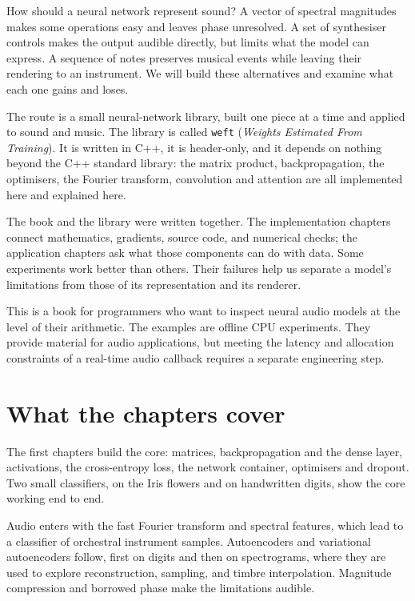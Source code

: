 
How should a neural network represent sound? A vector of spectral
magnitudes makes some operations easy and leaves phase unresolved. A
set of synthesiser controls makes the output audible directly, but limits
what the model can express. A sequence of notes preserves musical
events while leaving their rendering to an instrument. We will build
these alternatives and examine what each one gains and loses.

The route is a small neural-network library, built one piece at a
time and applied to sound and music. The
library is called \texttt{weft} (\emph{Weights Estimated From Training}).
It is written in C++, it is header-only, and it depends on nothing beyond
the C++ standard library: the matrix product, backpropagation, the
optimisers, the Fourier transform, convolution and attention are all
implemented here and explained here.

The book and the library were written together. The implementation
chapters connect mathematics, gradients, source code, and numerical
checks; the application chapters ask what those components can do with
data. Some experiments work better than others. Their failures help us
separate a model's limitations from those of its representation and its
renderer.

This is a book for programmers who want to inspect neural audio models
at the level of their arithmetic. The examples are offline CPU
experiments. They provide material for audio applications, but meeting
the latency and allocation constraints of a real-time audio callback
requires a separate engineering step.

\section*{What the chapters cover}

The first chapters build the core: matrices, backpropagation and the dense
layer, activations, the cross-entropy loss, the network container,
optimisers and dropout.  Two small classifiers, on the Iris flowers and on
handwritten digits, show the core working end to end.

Audio enters with the fast Fourier transform and spectral features, which
lead to a classifier of orchestral instrument samples.  Autoencoders and
variational autoencoders follow, first on digits and then on spectrograms,
where they are used to explore reconstruction, sampling, and timbre
interpolation. Magnitude compression and borrowed phase make the
limitations audible.

